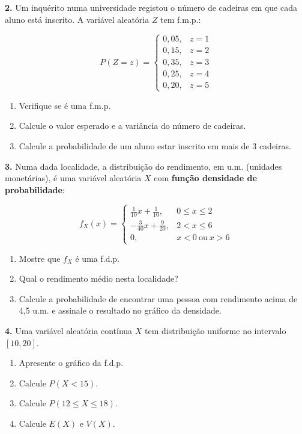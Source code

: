 \documentclass[
  portuguese,
  11pt,
  openany]{book}
\providecommand{\tightlist}{%
  \setlength{\itemsep}{0pt}\setlength{\parskip}{0pt}}
\begin{document}
\textbf{2.} Um inquérito numa universidade registou o número de cadeiras em que cada aluno
está inscrito. A variável aleatória \(Z\) tem f.m.p.:

\[P(Z = z) = \begin{cases}
0{,}05, & z = 1 \\ 0{,}15, & z = 2 \\ 0{,}35, & z = 3 \\ 0{,}25, & z = 4 \\ 0{,}20, & z = 5
\end{cases}\]

\begin{enumerate}
\def\labelenumi{(\alph{enumi})}
\tightlist
\item
  Verifique se é uma f.m.p.
\item
  Calcule o valor esperado e a variância do número de cadeiras.
\item
  Calcule a probabilidade de um aluno estar inscrito em mais de 3 cadeiras.
\end{enumerate}

\textbf{3.} Numa dada localidade, a distribuição do rendimento, em u.m. (unidades
monetárias), é uma variável aleatória \(X\) com \textbf{função densidade de probabilidade}:

\[f_X(x) = \begin{cases}
\frac{1}{10}x + \frac{1}{10}, & 0 \leq x \leq 2 \\[4pt]
-\frac{3}{40}x + \frac{9}{20}, & 2 < x \leq 6 \\[4pt]
0, & x < 0 \ \text{ou} \ x > 6
\end{cases}\]

\begin{enumerate}
\def\labelenumi{(\alph{enumi})}
\tightlist
\item
  Mostre que \(f_X\) é uma f.d.p.
\item
  Qual o rendimento médio nesta localidade?
\item
  Calcule a probabilidade de encontrar uma pessoa com rendimento acima de 4,5 u.m. e
  assinale o resultado no gráfico da densidade.
\end{enumerate}

\textbf{4.} Uma variável aleatória contínua \(X\) tem distribuição uniforme no intervalo
\([10, 20]\).

\begin{enumerate}
\def\labelenumi{(\alph{enumi})}
\tightlist
\item
  Apresente o gráfico da f.d.p.
\item
  Calcule \(P(X < 15)\).
\item
  Calcule \(P(12 \leq X \leq 18)\).
\item
  Calcule \(E(X)\) e \(V(X)\).
\end{enumerate}
\end{document}
